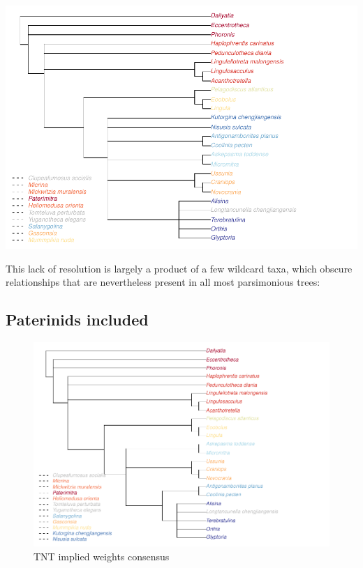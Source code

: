 \documentclass[]{book}
\theoremstyle{definition}
\theoremstyle{definition}
\theoremstyle{definition}
\theoremstyle{remark}
\begin{document}
\includegraphics{Brachiopod_phylogeny_files/figure-latex/unnamed-chunk-10-1.pdf}

This lack of resolution is largely a product of a few wildcard taxa,
which obscure relationships that are nevertheless present in all most
parsimonious trees:

\hypertarget{paterinids-included}{%
\subsection{Paterinids included}\label{paterinids-included}}

\begin{figure}
\centering
\includegraphics{Brachiopod_phylogeny_files/figure-latex/unnamed-chunk-11-1.pdf}
\caption{\label{fig:unnamed-chunk-11}TNT implied weights consensus}
\end{figure}
\end{document}
